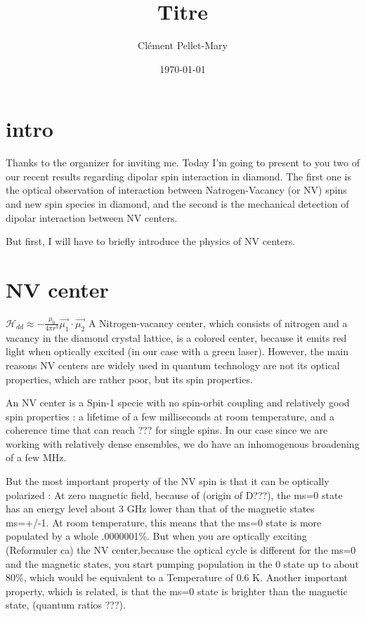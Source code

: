 \documentclass[a4paper]{article}
\title{Titre}
\author{Clément Pellet-Mary}
\date\today
\begin{document}
\section{intro}
Thanks to the organizer for inviting me. Today I'm going to present to you two of our recent results regarding dipolar spin interaction in diamond. The first one is the optical observation of interaction between Natrogen-Vacancy (or NV) spins and new spin species in diamond, and the second is the mechanical detection of dipolar interaction between NV centers.

But first, I will have to briefly introduce the physics of NV centers.

\section{NV center}
$\mathcal{H}_{dd} \approx - \frac{\mu_0}{4\pi r^3} \vec{\mu_1}\cdot \vec{\mu_2}$
A Nitrogen-vacancy center, which consists of nitrogen and a vacancy in the diamond crystal lattice, is a colored center, because it emits red light when optically excited (in our case with a green laser). However, the main reasons NV centers are widely used in quantum technology are not its optical properties, which are rather poor, but its spin properties.

An NV center is a Spin-1 specie with no spin-orbit coupling and relatively good spin properties : a lifetime of a few milliseconds at room temperature, and a coherence time that can reach ??? for single spins. In our case since we are working with relatively dense ensembles, we do have an inhomogenous broadening of a few MHz. 

But the most important property of the NV spin is that it can be optically polarized : At zero magnetic field, because of (origin of D???), the ms=0 state has an energy level about 3 GHz lower than that of the magnetic states ms=+/-1. At room temperature, this means that the ms=0 state is more populated by a whole .0000001\%. But when you are optically exciting (Reformuler ca) the NV center,because the optical cycle is different for the ms=0 and the magnetic states, you start pumping population in the 0 state up to about 80\%, which would be equivalent to a Temperature of 0.6 K. Another important property, which is related, is that the ms=0 state is brighter than the magnetic state, (quantum ratios ???).
\end{document}

